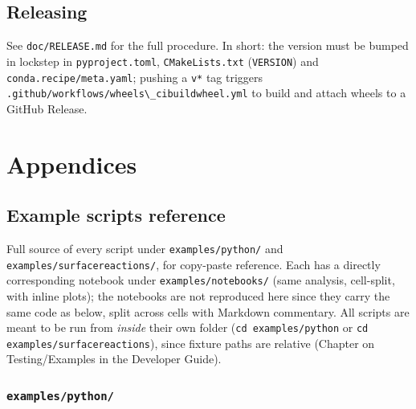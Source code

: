 \documentclass[11pt,a4paper]{report}
\newcommand{\pkg}[1]{\lstinline|#1|}
\begin{document}
\chapter{Releasing}

See \pkg{doc/RELEASE.md} for the full procedure. In short: the version must
be bumped in lockstep in \pkg{pyproject.toml}, \pkg{CMakeLists.txt}
(\pkg{VERSION}) and \pkg{conda.recipe/meta.yaml}; pushing a \pkg{v*} tag
triggers \pkg{.github/workflows/wheels\_cibuildwheel.yml} to build and
attach wheels to a GitHub Release.

\appendix
\part{Appendices}

\chapter{Example scripts reference}
\label{app:examples}

Full source of every script under \pkg{examples/python/} and
\pkg{examples/surfacereactions/}, for copy-paste reference. Each has a
directly corresponding notebook under \pkg{examples/notebooks/} (same
analysis, cell-split, with inline plots); the notebooks are not reproduced
here since they carry the same code as below, split across cells with
Markdown commentary. All scripts are meant to be run from \emph{inside}
their own folder (\pkg{cd examples/python} or
\pkg{cd examples/surfacereactions}), since fixture paths are relative
(Chapter on Testing/Examples in the Developer Guide).

\section{\texttt{examples/python/}}
\end{document}
